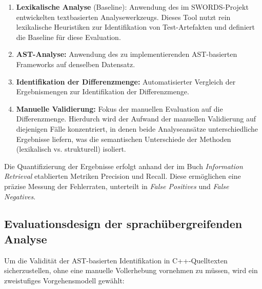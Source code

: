 \documentclass[12pt,titlepage]{article}
\begin{document}
\begin{enumerate}
    \item \textbf{Lexikalische Analyse} (Baseline): Anwendung des im SWORDS-Projekt\cite{SWORDS_template_UP_2024} entwickelten textbasierten Analysewerkzeugs. Dieses Tool nutzt rein lexikalische Heuristiken zur Identifikation von Test-Artefakten und definiert die Baseline für diese Evaluation.
    \item \textbf{AST-Analyse:} Anwendung des zu implementierenden AST-basierten Frameworks auf denselben Datensatz.
    \item \textbf{Identifikation der Differenzmenge:} Automatisierter Vergleich der Ergebnismengen zur Identifikation der Differenzmenge.
    \item \textbf{Manuelle Validierung:} Fokus der manuellen Evaluation auf die Differenzmenge. Hierdurch wird der Aufwand der manuellen Validierung auf diejenigen Fälle konzentriert, in denen beide Analyseansätze unterschiedliche Ergebnisse liefern, was die semantischen Unterschiede der Methoden (lexikalisch vs. strukturell) isoliert.
\end{enumerate}

Die Quantifizierung der Ergebnisse erfolgt anhand der im Buch \textit{Information Retrieval}\cite{manning2008introduction} etablierten Metriken Precision und Recall. Diese ermöglichen eine präzise Messung der Fehlerraten, unterteilt in \textit{False Positives} und \textit{False Negatives}.

\subsection{Evaluationsdesign der sprachübergreifenden Analyse}
\label{sec:cpp-evaluation}

Um die Validität der AST-basierten Identifikation in C++-Quelltexten sicherzustellen, ohne eine manuelle Vollerhebung vornehmen zu müssen, wird ein zweistufiges Vorgehensmodell gewählt:
\end{document}
